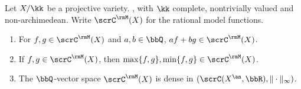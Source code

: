 \begin{proposition}[label=\labelNFM{prop:basic-properties-of-model-function}, status=draft, tag=0000000]
	Let $X/\kk$ be a projective variety.
	, with $\kk$ complete, nontrivially valued and non-archimedean.
	Write $\scrC^\rmM(X)$ for the rational model functions.
	\begin{enumerate}
		\item For $f,g \in \scrC^\rmM(X)$ and $a,b \in \bbQ$, $af+bg \in \scrC^\rmM(X)$.
		\item If $f,g \in \scrC^\rmM(X)$, then $\max\{f,g\},\min\{f,g\} \in \scrC^\rmM(X)$.
		\item The $\bbQ$-vector space $\scrC^\rmM(X)$ is dense in $(\scrC(X^\an,\bbR), \|\cdot\|_\infty)$.
	\end{enumerate}
	\Yang{}
\end{proposition}

